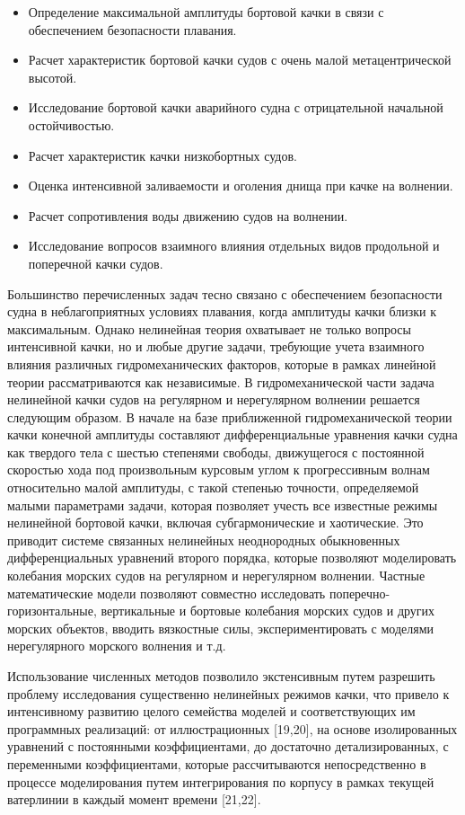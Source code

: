 \begin{itemize}
\item	Определение максимальной амплитуды бортовой качки в связи с обеспечением безопасности плавания.
\item	Расчет характеристик бортовой качки судов с очень малой метацентрической высотой.
\item	Исследование бортовой качки аварийного судна с отрицательной начальной остойчивостью.
\item	Расчет характеристик качки низкобортных судов.
\item	Оценка интенсивной заливаемости и оголения днища при качке на волнении.
\item	Расчет сопротивления воды движению судов на волнении.
\item	Исследование вопросов взаимного влияния отдельных видов продольной и поперечной качки судов.
\end{itemize}

Большинство перечисленных задач тесно связано с обеспечением безопасности судна в неблагоприятных условиях плавания, когда амплитуды качки близки к максимальным. Однако нелинейная теория охватывает не только вопросы интенсивной качки, но и любые другие задачи, требующие учета взаимного влияния различных гидромеханических факторов, которые в рамках линейной теории рассматриваются как независимые. В гидромеханической части задача нелинейной качки судов на регулярном и нерегулярном волнении решается следующим образом. В начале на базе приближенной гидромеханической теории качки конечной амплитуды составляют дифференциальные уравнения качки судна как твердого тела с шестью степенями свободы, движущегося с постоянной скоростью хода под произвольным курсовым углом к прогрессивным волнам относительно малой амплитуды, с такой степенью точности, определяемой малыми параметрами задачи, которая позволяет учесть все известные режимы нелинейной бортовой качки, включая субгармонические и хаотические. Это приводит системе связанных нелинейных неоднородных обыкновенных дифференциальных уравнений второго порядка, которые позволяют моделировать колебания морских судов на регулярном и нерегулярном волнении. Частные математические модели позволяют совместно исследовать поперечно-горизонтальные, вертикальные и бортовые колебания морских судов и других морских объектов, вводить вязкостные силы, экспериментировать с моделями нерегулярного морского волнения и т.д.

Использование численных методов позволило экстенсивным путем разрешить проблему исследования существенно нелинейных режимов качки, что привело к интенсивному развитию целого семейства моделей и соответствующих им программных реализаций: от иллюстрационных [19,20], на основе изолированных уравнений с постоянными коэффициентами, до достаточно детализированных, с переменными коэффициентами, которые рассчитываются непосредственно в процессе моделирования путем интегрирования по корпусу в рамках текущей ватерлинии в каждый момент времени [21,22].

